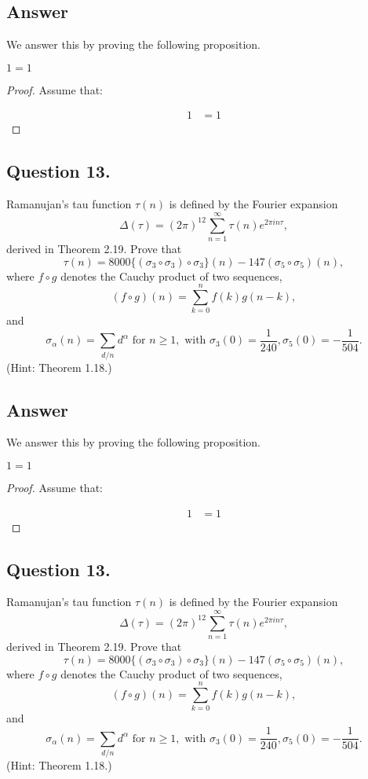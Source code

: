 \subsection*{Answer}
\noindent
We answer this by proving the following proposition.

\begin{proposition}
    $1=1$
\end{proposition}

\begin{proof}
    Assume that:

    \begin{align*}
        1 &= 1
    \end{align*}

\end{proof}


\subsection{Question 13.}
\noindent
Ramanujan's tau function $\tau(n)$ is defined by the Fourier expansion
\[
    \Delta(\tau)=(2\pi)^{12}\sum_{n=1}^{\infty}\tau(n)e^{2\pi i n \tau},
\]
derived in Theorem 2.19. Prove that
\[
    \tau(n)=8000 \{ (\sigma_3 \circ \sigma_3) \circ \sigma_3 \}(n) - 147 (\sigma_5 \circ \sigma_5)(n),
\]
where $f \circ g$ denotes the Cauchy product of two sequences,
\[
    (f \circ g)(n) = \sum_{k=0}^{n}f(k)g(n-k),
\]
and
\[
    \sigma_{\alpha}(n)= \sum_{d/n} d^{\alpha} \text{ for } n\geq 1, \text{ with } \sigma_3(0)=\frac{1}{240},
    \sigma_5(0)=-\frac{1}{504}.
\]
(Hint: Theorem 1.18.)

\subsection*{Answer}
\noindent
We answer this by proving the following proposition.

\begin{proposition}
    $1=1$
\end{proposition}

\begin{proof}
    Assume that:

    \begin{align*}
        1 &= 1
    \end{align*}

\end{proof}


\subsection{Question 13.}
\noindent
Ramanujan's tau function $\tau(n)$ is defined by the Fourier expansion
\[
    \Delta(\tau)=(2\pi)^{12}\sum_{n=1}^{\infty}\tau(n)e^{2\pi i n \tau},
\]
derived in Theorem 2.19. Prove that
\[
    \tau(n)=8000 \{ (\sigma_3 \circ \sigma_3) \circ \sigma_3 \}(n) - 147 (\sigma_5 \circ \sigma_5)(n),
\]
where $f \circ g$ denotes the Cauchy product of two sequences,
\[
    (f \circ g)(n) = \sum_{k=0}^{n}f(k)g(n-k),
\]
and
\[
    \sigma_{\alpha}(n)= \sum_{d/n} d^{\alpha} \text{ for } n\geq 1, \text{ with } \sigma_3(0)=\frac{1}{240},
    \sigma_5(0)=-\frac{1}{504}.
\]
(Hint: Theorem 1.18.)

